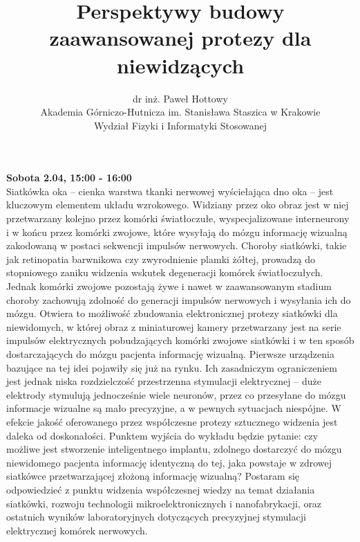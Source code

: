 \documentclass[12pt, a4paper]{article}
\begin{document}
\title{Perspektywy budowy zaawansowanej protezy dla niewidzących}
\author{dr inż. Paweł Hottowy \\Akademia Górniczo-Hutnicza im. Stanisława Staszica w Krakowie \\Wydział Fizyki i Informatyki Stosowanej}
\date {}
\maketitle
\thispagestyle{title}
\textbf{Sobota 2.04, 15:00 - 16:00}
\\

Siatkówka oka – cienka warstwa tkanki nerwowej wyściełająca dno oka – jest kluczowym elementem układu wzrokowego. Widziany przez oko obraz jest w niej przetwarzany kolejno przez komórki światłoczułe, wyspecjalizowane interneurony i w końcu przez komórki zwojowe, które wysyłają do mózgu informację wizualną zakodowaną w postaci sekwencji impulsów nerwowych. Choroby siatkówki, takie jak retinopatia barwnikowa czy zwyrodnienie plamki żółtej, prowadzą do stopniowego zaniku widzenia wskutek degeneracji komórek światłoczułych. Jednak komórki zwojowe pozostają żywe i nawet w zaawansowanym stadium choroby zachowują zdolność do generacji impulsów nerwowych i wysyłania ich do mózgu. Otwiera to możliwość zbudowania elektronicznej protezy siatkówki dla niewidomych, w której obraz z miniaturowej kamery przetwarzany jest na serie impulsów elektrycznych pobudzających komórki zwojowe siatkówki i w ten sposób dostarczających do mózgu pacjenta informację wizualną. Pierwsze urządzenia bazujące na tej idei pojawiły się już na rynku. Ich zasadniczym ograniczeniem jest jednak niska rozdzielczość przestrzenna stymulacji elektrycznej – duże elektrody stymulują jednocześnie wiele neuronów, przez co przesyłane do mózgu informacje wizualne są mało precyzyjne, a w pewnych sytuacjach niespójne. W efekcie jakość oferowanego przez współczesne protezy sztucznego widzenia jest daleka od doskonałości. Punktem wyjścia do wykładu będzie pytanie: czy możliwe jest stworzenie inteligentnego implantu, zdolnego dostarczyć do mózgu niewidomego pacjenta informację identyczną do tej, jaka powstaje w zdrowej siatkówce przetwarzającej złożoną informację wizualną? Postaram się odpowiedzieć z punktu widzenia współczesnej wiedzy na temat działania siatkówki, rozwoju technologii mikroelektronicznych i nanofabrykacji, oraz ostatnich wyników laboratoryjnych dotyczących precyzyjnej stymulacji elektrycznej komórek nerwowych.
\end{document}
